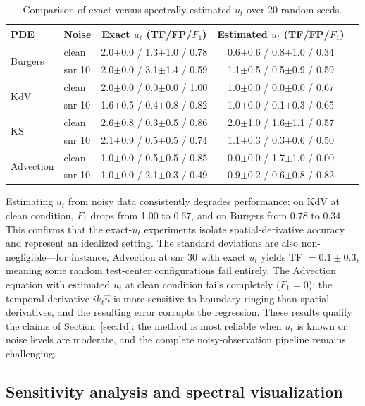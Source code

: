 \documentclass[preprint,12pt]{elsarticle}
\begin{document}
\begin{table}[H]
\centering
\caption{Comparison of exact versus spectrally estimated $u_t$ over 20 random seeds.}
\label{tab:noisy_ut}
\small
\begin{tabular}{llccc}
\toprule
PDE & Noise & Exact $u_t$ (TF/FP/$F_1$) & Estimated $u_t$ (TF/FP/$F_1$) \\
\midrule
\multirow{2}{*}{Burgers}
& clean & 2.0$\pm$0.0 / 1.3$\pm$1.0 / 0.78 & 0.6$\pm$0.6 / 0.8$\pm$1.0 / 0.34 \\
& snr 10 & 2.0$\pm$0.0 / 3.1$\pm$1.4 / 0.59 & 1.1$\pm$0.5 / 0.5$\pm$0.9 / 0.59 \\
\multirow{2}{*}{KdV}
& clean & 2.0$\pm$0.0 / 0.0$\pm$0.0 / 1.00 & 1.0$\pm$0.0 / 0.0$\pm$0.0 / 0.67 \\
& snr 10 & 1.6$\pm$0.5 / 0.4$\pm$0.8 / 0.82 & 1.0$\pm$0.0 / 0.1$\pm$0.3 / 0.65 \\
\multirow{2}{*}{KS}
& clean & 2.6$\pm$0.8 / 0.3$\pm$0.5 / 0.86 & 2.0$\pm$1.0 / 1.6$\pm$1.1 / 0.57 \\
& snr 10 & 2.1$\pm$0.9 / 0.5$\pm$0.5 / 0.74 & 1.1$\pm$0.3 / 0.3$\pm$0.6 / 0.50 \\
\multirow{2}{*}{Advection}
& clean & 1.0$\pm$0.0 / 0.5$\pm$0.5 / 0.85 & 0.0$\pm$0.0 / 1.7$\pm$1.0 / 0.00 \\
& snr 10 & 1.0$\pm$0.0 / 2.1$\pm$0.3 / 0.49 & 0.9$\pm$0.2 / 0.6$\pm$0.8 / 0.82 \\
\bottomrule
\end{tabular}
\end{table}

Estimating $u_t$ from noisy data consistently degrades performance: on KdV at clean condition, $F_1$ drops from 1.00 to 0.67, and on Burgers from 0.78 to 0.34. This confirms that the exact-$u_t$ experiments isolate spatial-derivative accuracy and represent an idealized setting. The standard deviations are also non-negligible---for instance, Advection at snr 30 with exact $u_t$ yields TF $= 0.1\pm0.3$, meaning some random test-center configurations fail entirely. The Advection equation with estimated $u_t$ at clean condition fails completely ($F_1=0$): the temporal derivative $ik_t\hat{u}$ is more sensitive to boundary ringing than spatial derivatives, and the resulting error corrupts the regression. These results qualify the claims of Section~\ref{sec:1d}: the method is most reliable when $u_t$ is known or noise levels are moderate, and the complete noisy-observation pipeline remains challenging.

\subsection{Sensitivity analysis and spectral visualization}
\label{sec:sensitivity}
\end{document}
